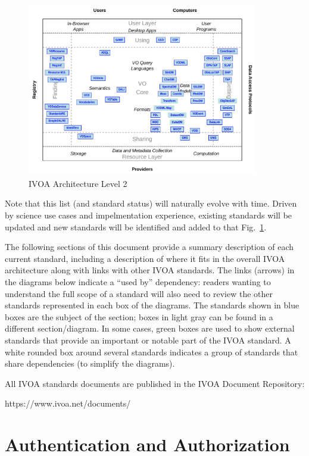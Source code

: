 \documentclass[11pt,a4paper]{ivoa}
\begin{document}
\begin{figure}[h]
\centering
\includegraphics[width=0.9\textwidth]{archdiag2.pdf}
\caption{IVOA Architecture Level 2}
\label{fig:architecture2}
\end{figure}

Note that this list  (and standard status) will naturally evolve with time. Driven by
science use cases and impelmentation experience, existing standards will be updated and
new standards will be identified and added to that Fig.~\ref{fig:architecture2}. 

The following sections of this document provide a summary description of each current standard, 
including a description of where it fits in the overall IVOA architecture along with links with 
other IVOA standards. The links 
(arrows) in the diagrams below indicate a ``used by'' dependency: readers wanting to 
understand the full scope of a standard will also need to review the other standards 
represented in each box of the diagrams. 
The standards shown in blue boxes are the subject of the section; 
boxes in light gray can be found in a different section/diagram. 
In some cases, green boxes are used to show external standards that provide an 
important or notable part of the IVOA standard. 
A white rounded box around several standards indicates a group of standards that share 
dependencies (to simplify the diagrams).

All IVOA standards documents are published in the IVOA Document Repository:

https://www.ivoa.net/documents/


\section{Authentication and Authorization}
\end{document}

